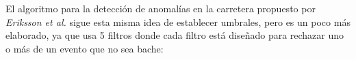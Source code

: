 


		El algoritmo para la detección de anomalías en la carretera propuesto por \emph{Eriksson et al.} sigue
		esta misma idea de establecer umbrales, pero es un poco más elaborado, ya que usa 5 filtros donde cada filtro está diseñado
		para rechazar uno o más de un evento que no sea bache:\\

